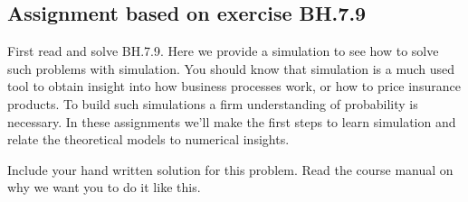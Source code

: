 \subsection{Assignment based on exercise BH.7.9}
\label{sec:bh.7.9}

First read and solve BH.7.9. Here we provide a simulation to see how to solve such problems with simulation. You should know that simulation is a much used tool to obtain insight into how business processes work, or how to price insurance products. To build such simulations a firm understanding of probability is necessary. In these assignments we'll make the first steps to learn simulation and relate the theoretical models to numerical insights.

\begin{exercise}
Include your hand written solution for this problem. Read the course manual  on why we want you to do it like this.
\end{exercise}


